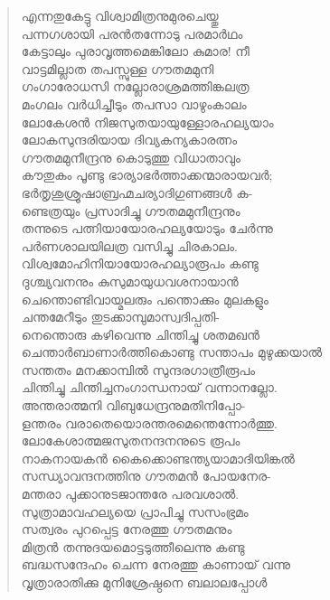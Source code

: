 \begin{verse}
എന്നതുകേട്ടു വിശ്വാമിത്രനുമുരചെയ്തു\\
പന്നഗശായി പരന്‍തന്നോടു പരമാര്‍ഥം\\
കേട്ടാലും പുരാവൃത്തമെങ്കിലോ കുമാര! നീ\\
വാട്ടമില്ലാത തപസ്സുള്ള ഗൗതമമുനി\\
ഗംഗാരോധസി നല്ലോരാശ്രമത്തിങ്കലത്ര\\
മംഗലം വര്‍ധിച്ചീടും തപസാ വാഴുംകാലം\\
ലോകേശന്‍ നിജസുതയായുള്ളോരഹല്യയാം\\
ലോകസുന്ദരിയായ ദിവ്യകന്യകാരത്നം\\
ഗൗതമമുനീന്ദ്രനു കൊടുത്തു വിധാതാവും\\
കൗതുകം പൂണ്ടു ഭാര്യാഭര്‍ത്താക്കന്മാരായവര്‍;\\
ഭര്‍തൃശുശ്രൂഷാബ്രഹ്മചര്യാദിഗുണങ്ങള്‍ ക-\\
ണ്ടെത്രയും പ്രസാദിച്ചു ഗൗതമമുനീന്ദ്രനും\\
തന്നുടെ പത്നിയായോരഹല്യയോടും ചേര്‍ന്നു\\
പര്‍ണശാലയിലത്ര വസിച്ചു ചിരകാലം.\\
വിശ്വമോഹിനിയായോരഹല്യാരൂപം കണ്ടു\\
ദുശ്ച്യവനനും കുസുമായുധവശനായാന്‍\\
ചെന്തൊണ്ടിവായ്മലരും പന്തൊക്കും മുലകളും\\
ചന്തമേറീടും തുടക്കാമ്പുമാസ്വദിപ്പതി-\\
നെന്തൊരു കഴിവെന്നു ചിന്തിച്ചു ശതമഖന്‍\\
ചെന്താര്‍ബാണാര്‍ത്തികൊണ്ടു സന്താപം \hbox{മുഴുക്കയാല്‍}\\
സന്തതം മനക്കാമ്പില്‍ സുന്ദരഗാത്രീരൂപം\\
ചിന്തിച്ചു ചിന്തിച്ചനംഗാന്ധനായ് വന്നാനല്ലോ.\\
അന്തരാത്മനി വിബുധേന്ദ്രനുമതിനിപ്പോ-\\
ളന്തരം വരാതെയൊരന്തരമെന്തെന്നോര്‍ത്തു.\\
ലോകേശാത്മജസുതനന്ദനനുടെ രൂപം\\
നാകനായകന്‍ കൈക്കൊണ്ടന്ത്യയാമാദിയിങ്കല്‍\\
സന്ധ്യാവന്ദനത്തിനു ഗൗതമന്‍ പോയനേര-\\
മന്തരാ പുക്കാനുടജാന്തരേ പരവശാല്‍.\\
സുത്രാമാവഹല്യയെ പ്രാപിച്ചു സസംഭ്രമം\\
സത്വരം പുറപ്പെട്ട നേരത്തു ഗൗതമനും\\
മിത്രന്‍ തന്നുദയമൊട്ടടുത്തീലെന്നു കണ്ടു\\
ബദ്ധസന്ദേഹം ചെന്ന നേരത്തു കാണായ് വന്നു\\
വൃത്രാരാതിക്കു മുനിശ്രേഷ്ഠനെ ബലാലപ്പോള്‍\\

\end{verse}
